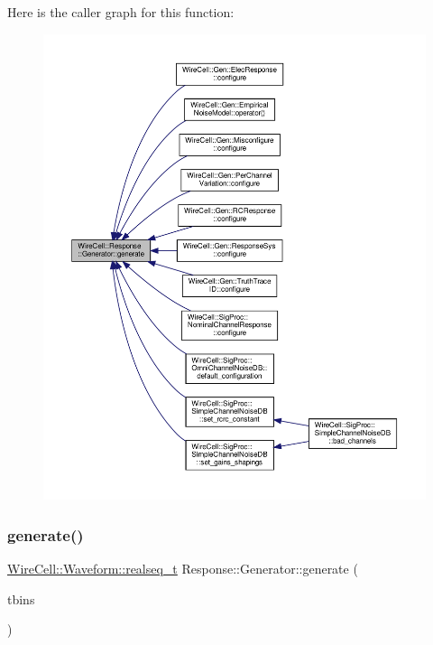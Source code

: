 Here is the caller graph for this function\+:
\nopagebreak
\begin{figure}[H]
\begin{center}
\leavevmode
\includegraphics[width=350pt]{class_wire_cell_1_1_response_1_1_generator_aceed932e0bab5af1cb80981507667e5e_icgraph}
\end{center}
\end{figure}
\mbox{\label{class_wire_cell_1_1_response_1_1_generator_a571c13c36686dc25f987b0c189a6ce92}} 
\subsubsection{\texorpdfstring{generate()}{generate()}\hspace{0.1cm}{\footnotesize\ttfamily [2/2]}}
{\footnotesize\ttfamily \hyperlink{namespace_wire_cell_1_1_waveform_a479175e541c8545e87cd8063b74b6956}{Wire\+Cell\+::\+Waveform\+::realseq\+\_\+t} Response\+::\+Generator\+::generate (\begin{DoxyParamCaption}\item[{const \hyperlink{class_wire_cell_1_1_binning}{Wire\+Cell\+::\+Binning} \&}]{tbins }\end{DoxyParamCaption})}



